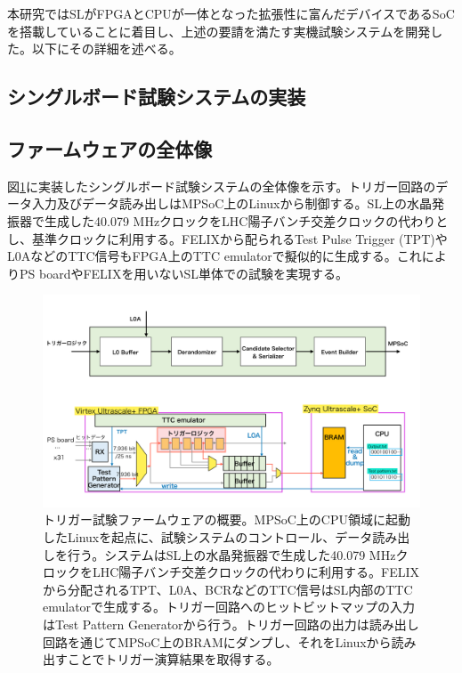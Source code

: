 本研究ではSLがFPGAとCPUが一体となった拡張性に富んだデバイスであるSoCを搭載していることに着目し、上述の要請を満たす実機試験システムを開発した。以下にその詳細を述べる。

\subsection{シングルボード試験システムの実装}

\subsection*{ファームウェアの全体像}
\label{subsec_FirmwareOverview}

図\ref{TestSystem_Overview}に実装したシングルボード試験システムの全体像を示す。トリガー回路のデータ入力及びデータ読み出しはMPSoC上のLinuxから制御する。SL上の水晶発振器で生成した40.079 MHzクロックをLHC陽子バンチ交差クロックの代わりとし、基準クロックに利用する。FELIXから配られるTest Pulse Trigger (TPT)やL0AなどのTTC信号もFPGA上のTTC emulatorで擬似的に生成する。これによりPS boardやFELIXを用いないSL単体での試験を実現する。

\begin{figure} 
    \centering
    \includegraphics[width=16cm]{fig/Test/TestSystem_overview.pdf}
    \caption[トリガー試験ファームウェアの概要]{トリガー試験ファームウェアの概要。MPSoC上のCPU領域に起動したLinuxを起点に、試験システムのコントロール、データ読み出しを行う。システムはSL上の水晶発振器で生成した40.079 MHzクロックをLHC陽子バンチ交差クロックの代わりに利用する。FELIXから分配されるTPT、L0A、BCRなどのTTC信号はSL内部のTTC emulatorで生成する。トリガー回路へのヒットビットマップの入力はTest Pattern Generatorから行う。トリガー回路の出力は読み出し回路を通じてMPSoC上のBRAMにダンプし、それをLinuxから読み出すことでトリガー演算結果を取得する。}
    \label{TestSystem_Overview}
\end{figure}

